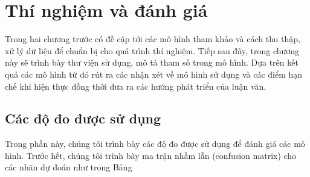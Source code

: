\chapter{Thí nghiệm và đánh giá} \label{chap-Implement}
Trong hai chương trước có đề cập tới các mô hình tham khảo và cách thu thập, xử lý dữ liệu để chuẩn bị cho quá trình thí nghiệm. Tiếp sau đây, trong chương này sẽ trình bày thư viện sử dụng, mô tả tham số trong mô hình. Dựa trên kết quả các mô hình từ đó rút ra các nhận xét về mô hình sử dụng và các điểm hạn chế khi hiện thực đồng thời đưa ra các hướng phát triển của luận văn.

\section{Các độ đo được sử dụng}
Trong phần này, chúng tôi trình bày các độ đo được sử dụng để đánh giá các mô hình. Trước
hết, chúng tôi trình bày ma trận nhầm lẫn (confusion matrix) cho các nhãn dự đoán như trong Bảng 


%  
 



% 
    


